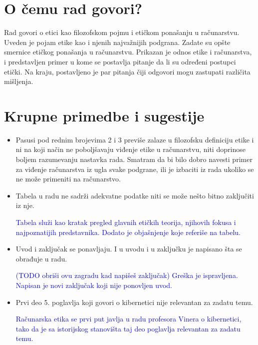 \documentclass[a4paper]{report}
\newcommand{\odgovor}[1]{\textcolor{blue}{#1}}
\begin{document}
\section{O čemu rad govori?}

Rad govori o etici kao filozofskom pojmu i etičkom ponašanju u računarstvu. Uveden je pojam etike kao i njenih najvažnijih podgrana. Zadate su opšte smernice etičkog ponašanja u računarstvu. Prikazan je odnos etike i računarstva, i predstavljen primer u kome se postavlja pitanje da li su određeni postupci etički. Na kraju, postavljeno je par pitanja čiji odgovori mogu zastupati različita mišljenja.


\section{Krupne primedbe i sugestije}
\begin{itemize}
    \item Pasusi pod rednim brojevima 2 i 3 previše zalaze u filozofsku definiciju etike i ni na koji način ne poboljšavaju viđenje etike u računarstvu, niti doprinose boljem razumevanju nastavka rada. Smatram da bi bilo dobro navesti primer za viđenje računarstva iz ugla svake podgrane, ili je izbaciti iz rada ukoliko se ne može primeniti na računarstvo.
    \item Tabela u radu ne sadrži adekvatne podatke niti se može nešto bitno zaključiti iz nje.

\odgovor{Tabela služi kao kratak pregled glavnih etičkih teorija, njihovih fokusa i najpoznatijih predstavnika. Dodato je objašnjenje koje referiše na tabelu. }

    \item Uvod i zaključak se ponavljaju. I u uvodu i u zaključku je napisano šta se obrađuje u radu.
    
    \odgovor{(TODO obriši ovu zagradu kad napišeš zaključak) Greška je ispravljena. Napisan je novi zaključak koji nije ponovljen uvod.}
    
    \item Prvi deo 5. poglavlja koji govori o kibernetici nije relevantan za zadatu temu.
    
    \odgovor{Računarska etika se prvi put javlja u radu profesora Vinera o kibernetici, tako da je sa istorijskog stanovišta taj deo poglavlja relevantan za zadatu temu.}

\end{itemize}
\end{document}
